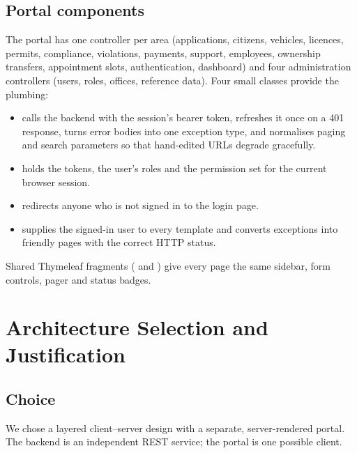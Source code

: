 \subsection{Portal components}
The portal has one controller per area (applications, citizens, vehicles, licences,
permits, compliance, violations, payments, support, employees, ownership transfers,
appointment slots, authentication, dashboard) and four administration controllers (users,
roles, offices, reference data). Four small classes provide the plumbing:
\begin{itemize}
\item {} calls the backend with the session's bearer token, refreshes it once on a 401 response, turns error bodies into one exception type, and normalises paging and search parameters so that hand-edited URLs degrade gracefully.
\item {} holds the tokens, the user's roles and the permission set for the current browser session.
\item {} redirects anyone who is not signed in to the login page.
\item {} supplies the signed-in user to every template and converts exceptions into friendly pages with the correct HTTP status.
\end{itemize}
Shared Thymeleaf fragments ( and ) give every page the same
sidebar, form controls, pager and status badges.

\section{Architecture Selection and Justification}
\subsection{Choice}
We chose a layered client--server design with a separate, server-rendered portal. The
backend is an independent REST service; the portal is one possible client.


